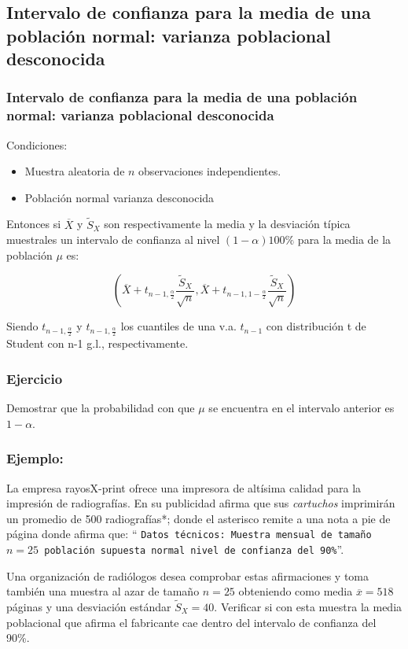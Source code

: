  \subsection{Intervalo de confianza para la media de una población normal:
        varianza poblacional desconocida}

\begin{frame}
   \frametitle{Intervalo de confianza para la media de una población normal:
        varianza poblacional desconocida}
Condiciones:
\begin{itemize}
\item Muestra aleatoria de $n$ observaciones independientes.
\item Población normal varianza desconocida
\end{itemize}
        Entonces si $\overline{X}$ y $\tilde{S}_{X}$ son respectivamente la media y
        la desviación típica muestrales un intervalo de confianza al nivel
        $(1-\alpha)100\%$ para la media de la población $\mu$ es:

$$\left( \overline{X}+t_{n-1,\frac{\alpha}{2}} \frac{\tilde{S}_{X}}{\sqrt{n}},
\overline{X}+t_{n-1,1-\frac{\alpha}{2}}\frac{\tilde{S}_{X}}{\sqrt{n}} \right)$$

Siendo $t_{n-1,\frac{\alpha}{2}}$ y $t_{n-1,\frac{\alpha}{2}}$ los cuantiles de una v.a.
$t_{n-1}$ con distribución t de Student con n-1 g.l., respectivamente.

\end{frame}

\begin{frame}
\frametitle{Ejercicio}
Demostrar que la probabilidad con  que $\mu$ se encuentra en el intervalo anterior es $1-\alpha$.

\end{frame}

\begin{frame}

\frametitle{Ejemplo:}
La empresa rayosX-print  ofrece una impresora de altísima calidad para la impresión de radiografías. En su publicidad afirma que sus
\emph{cartuchos}  imprimirán  un promedio de 500 radiografías*; donde el asterisco remite a una nota a
pie de página donde afirma que: `` \texttt{Datos técnicos: Muestra mensual de tamaño $n=25$
población supuesta normal nivel de confianza del 90\%}''.

Una organización de radiólogos desea comprobar estas afirmaciones y toma también una muestra al azar de tamaño $n=25$ obteniendo
como media $\overline{x}=518$ páginas y una desviación estándar $\tilde{S}_{X}=40$.  Verificar si con esta muestra la media
poblacional que afirma el fabricante cae dentro del intervalo de confianza del 90\%.
\end{frame}


